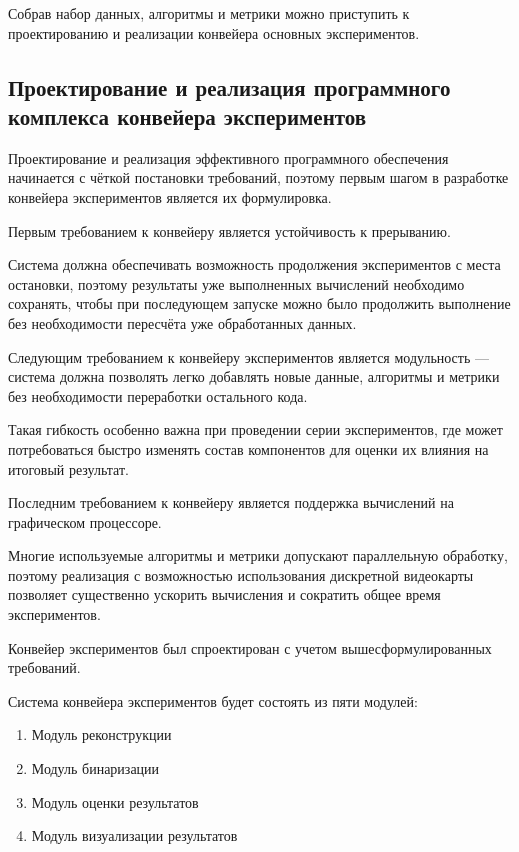 Собрав набор данных, алгоритмы и метрики можно приступить к проектированию и реализации конвейера основных экспериментов.

\subsection{Проектирование и реализация программного комплекса конвейера экспериментов}

Проектирование и реализация эффективного программного обеспечения начинается с чёткой постановки требований, поэтому первым шагом в разработке конвейера экспериментов является их формулировка.

Первым требованием к конвейеру является устойчивость к прерыванию.

Система должна обеспечивать возможность продолжения экспериментов с места остановки, поэтому результаты уже выполненных вычислений необходимо сохранять, чтобы при последующем запуске можно было продолжить выполнение без необходимости пересчёта уже обработанных данных.

Следующим требованием к конвейеру экспериментов является модульность — система должна позволять легко добавлять новые данные, алгоритмы и метрики без необходимости переработки остального кода.

 Такая гибкость особенно важна при проведении серии экспериментов, где может потребоваться быстро изменять состав компонентов для оценки их влияния на итоговый результат.

Последним требованием к конвейеру является поддержка вычислений на графическом процессоре.

Многие используемые алгоритмы и метрики допускают параллельную обработку, поэтому реализация с возможностью использования дискретной видеокарты позволяет существенно ускорить вычисления и сократить общее время экспериментов.

Конвейер экспериментов был спроектирован с учетом вышесформулированных требований.

Система конвейера экспериментов будет состоять из пяти модулей:
 
\begin{enumerate}
    \item Модуль реконструкции
    \item Модуль бинаризации
    \item Модуль оценки результатов
    \item Модуль визуализации результатов
\end{enumerate}

